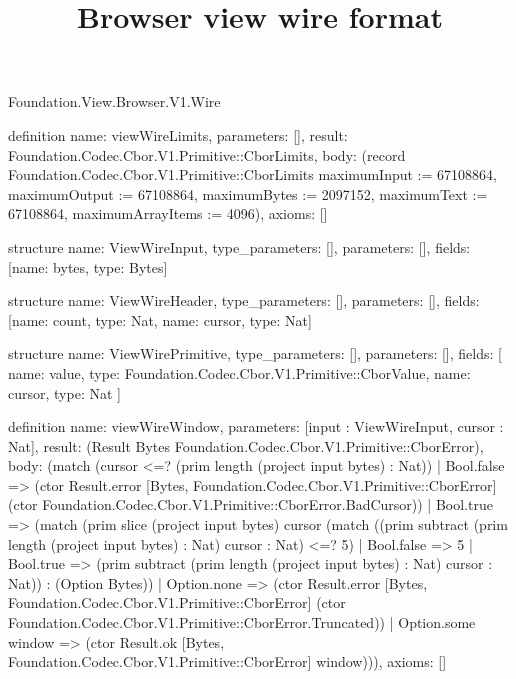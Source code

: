 \begin{lexlean}{Foundation.View.Browser.V1.Wire}
\title{Browser view wire format}
\begin{semanticmodule}
definition{
  name: viewWireLimits,
  parameters: [],
  result: Foundation.Codec.Cbor.V1.Primitive::CborLimits,
  body: (record Foundation.Codec.Cbor.V1.Primitive::CborLimits {maximumInput := 67108864, maximumOutput := 67108864, maximumBytes := 2097152, maximumText := 67108864, maximumArrayItems := 4096}),
  axioms: []
}

structure{
  name: ViewWireInput,
  type_parameters: [],
  parameters: [],
  fields: [{name: bytes, type: Bytes}]
}

structure{
  name: ViewWireHeader,
  type_parameters: [],
  parameters: [],
  fields: [{name: count, type: Nat}, {name: cursor, type: Nat}]
}

structure{
  name: ViewWirePrimitive,
  type_parameters: [],
  parameters: [],
  fields: [
    {name: value, type: Foundation.Codec.Cbor.V1.Primitive::CborValue},
    {name: cursor, type: Nat}
  ]
}

definition{
  name: viewWireWindow,
  parameters: [input : ViewWireInput, cursor : Nat],
  result: (Result Bytes Foundation.Codec.Cbor.V1.Primitive::CborError),
  body: (match (cursor <=? (prim length (project input bytes) : Nat))
    | Bool.false => (ctor Result.error [Bytes, Foundation.Codec.Cbor.V1.Primitive::CborError] (ctor Foundation.Codec.Cbor.V1.Primitive::CborError.BadCursor))
    | Bool.true => (match (prim slice (project input bytes) cursor (match ((prim subtract (prim length (project input bytes) : Nat) cursor : Nat) <=? 5)
        | Bool.false => 5
        | Bool.true => (prim subtract (prim length (project input bytes) : Nat) cursor : Nat)) : (Option Bytes))
      | Option.none => (ctor Result.error [Bytes, Foundation.Codec.Cbor.V1.Primitive::CborError] (ctor Foundation.Codec.Cbor.V1.Primitive::CborError.Truncated))
      | Option.some window => (ctor Result.ok [Bytes, Foundation.Codec.Cbor.V1.Primitive::CborError] window))),
  axioms: []
}


\end{semanticmodule}
\end{lexlean}

